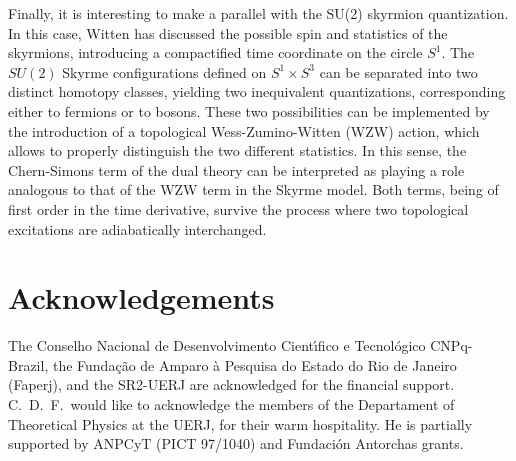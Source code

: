 \documentclass[a4paper,12pt]{article}
\begin{document}
Finally, it is interesting to make a parallel with the SU(2) skyrmion
quantization. In this case, Witten \cite{sky} has discussed the
possible spin and statistics of the skyrmions, introducing a
compactified time coordinate on the circle $S^1$. The $SU(2)$ Skyrme
configurations defined on $S^1 \times S^3 $ can be separated into two
distinct homotopy classes, yielding two inequivalent quantizations,
corresponding either to fermions or to bosons. These two possibilities
can be implemented by the introduction of a topological
Wess-Zumino-Witten (WZW) action, which allows to properly distinguish
the two different statistics.  In this sense, the Chern-Simons term of
the dual theory can be interpreted as playing a role analogous to that
of the WZW term in the Skyrme model. Both terms, being of first order
in the time derivative, survive the process where two topological
excitations are adiabatically interchanged.



\section*{Acknowledgements}
The Conselho Nacional de Desenvolvimento Cient\'{\i}fico e
Tecnol\'{o}gico CNPq-Brazil, the Funda{\c {c}}{\~{a}}o de Amparo
{\`{a}} Pesquisa do Estado do Rio de Janeiro (Faperj), and the
SR2-UERJ are acknowledged for the financial support.  C.~D.~F.~would
like to acknowledge the members of the Departament of Theoretical
Physics at the UERJ, for their warm hospitality.  He is partially
supported by ANPCyT (PICT 97/1040) and Fundaci{\'o}n Antorchas grants.
\end{document}
